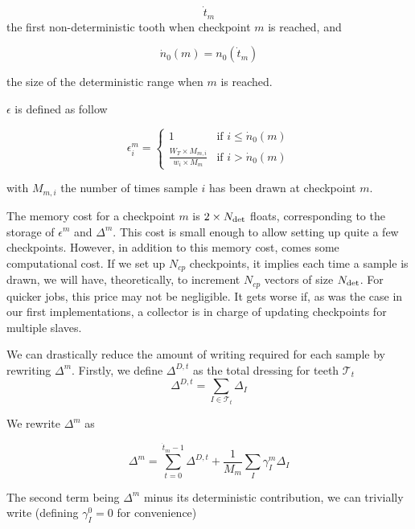 \documentclass[./thesis.tex]{subfiles}
\begin{document}
\begin{equation}
\dot t_m
\end{equation}
the first non-deterministic tooth when checkpoint $m$ is reached, and

\begin{equation}
\dot n_0(m) = n_0(\dot t_m)
\end{equation}

the size of the deterministic range when $m$ is reached.


$\epsilon$ is defined as follow

\begin{equation}
\epsilon^m_i = 
\begin{cases}
1 & \text{if } i \leq \dot n_0(m) \\
\frac{W_T \times M_{m,i}}{w_i \times M_m} & \text{if } i > \dot n_0(m)
\end{cases}
\end{equation}


with $M_{m,i}$ the number of times sample $i$ has been drawn at checkpoint $m$.


The memory cost for a checkpoint $m$ is $2 \times {N_\text{det}}$ floats, corresponding to the storage of $\epsilon^m$ and $\Delta^m$. This cost is small enough to allow setting up quite a few checkpoints. However, in addition to this memory cost, comes some computational cost. If we set up $N_{cp}$ checkpoints, it implies each time a sample is drawn, we will have, theoretically, to increment $N_{cp}$ vectors of size ${N_\text{det}}$. For quicker jobs, this price may not be negligible. It gets worse if, as was the case in our first implementations, a collector is in charge of updating checkpoints for multiple slaves. 


We can drastically reduce the amount of writing required for each sample by rewriting $\Delta^m$.
Firstly, we define $\Delta^{D,t}$ as the total dressing for teeth $\mathcal{T}_t$
\begin{equation}
\Delta^{D,t} = \sum_{I \in \mathcal{T}_t} \Delta_I
\end{equation}

We rewrite $\Delta^m$ as

\begin{equation}
\label{eq:rewrite1}
\Delta^{m} = \sum_{t=0}^{\dot t_m - 1} \Delta^{D,t}+ \frac{1}{M_m} \sum_{I} \gamma^m_{I} \Delta_I
\end{equation}

The second term being $\Delta^m$ minus its deterministic contribution, we can trivially write (defining $\gamma^ 0_I=0$ for convenience)
\end{document}
